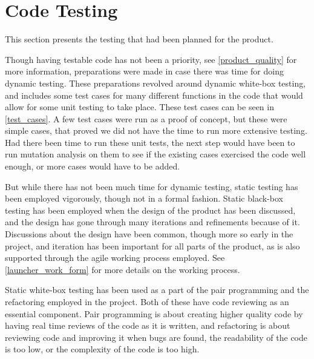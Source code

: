 \section{Code Testing}
This section presents the testing that had been planned for the product. \newline

Though having testable code has not been a priority, see \autoref{product_quality} for more information, preparations were made in case there was time for doing dynamic testing. 
These preparations revolved around dynamic white-box testing, and includes some test cases for many different functions in the code that would allow for some unit testing to take place. 
These test cases can be seen in \autoref{test_cases}. 
A few test cases were run as a proof of concept, but these were simple cases, that proved we did not have the time to run more extensive testing. \newline
Had there been time to run these unit tests, the next step would have been to run mutation analysis on them to see if the existing cases exercised the code well enough, or more cases would have to be added. \newline

But while there has not been much time for dynamic testing, static testing has been employed vigorously, though not in a formal fashion. 
Static black-box testing has been employed when the design of the product has been discussed, and the design has gone through many iterations and refinements because of it. 
Discussions about the design have been common, though more so early in the project, and iteration has been important for all parts of the product, as is also supported through the agile working process employed. 
See \autoref{launcher_work_form} for more details on the working process. \newline

Static white-box testing has been used as a part of the pair programming and the refactoring employed in the project. 
Both of these have code reviewing as an essential component. 
Pair programming is about creating higher quality code by having real time reviews of the code as it is written, and refactoring is about reviewing code and improving it when bugs are found, the readability of the code is too low, or the complexity of the code is too high.